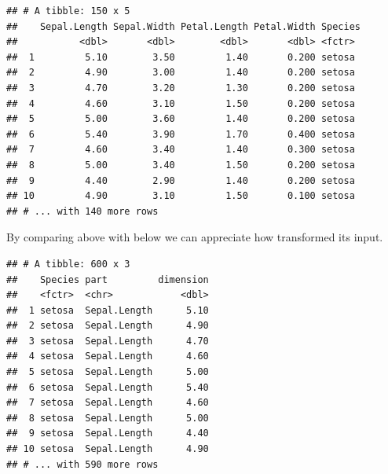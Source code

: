 \documentclass[krantz2,ChapterTOCs]{krantz}\usepackage{knitr}
\begin{document}
\begin{knitrout}\footnotesize
{}\color{fgcolor}\begin{kframe}
\begin{alltt}
 \hlkwb{<-} 
\end{alltt}
\begin{verbatim}
## # A tibble: 150 x 5
##    Sepal.Length Sepal.Width Petal.Length Petal.Width Species
##           <dbl>       <dbl>        <dbl>       <dbl> <fctr> 
##  1         5.10        3.50         1.40       0.200 setosa 
##  2         4.90        3.00         1.40       0.200 setosa 
##  3         4.70        3.20         1.30       0.200 setosa 
##  4         4.60        3.10         1.50       0.200 setosa 
##  5         5.00        3.60         1.40       0.200 setosa 
##  6         5.40        3.90         1.70       0.400 setosa 
##  7         4.60        3.40         1.40       0.300 setosa 
##  8         5.00        3.40         1.50       0.200 setosa 
##  9         4.40        2.90         1.40       0.200 setosa 
## 10         4.90        3.10         1.50       0.100 setosa 
## # ... with 140 more rows
\end{verbatim}
\end{kframe}
\end{knitrout}

By comparing  above with  below we can appreciate how  transformed its input.

\begin{knitrout}\footnotesize
{}\color{fgcolor}\begin{kframe}
\begin{alltt}
 \hlkwb{<-}      \hlopt{-}
\end{alltt}
\begin{verbatim}
## # A tibble: 600 x 3
##    Species part         dimension
##    <fctr>  <chr>            <dbl>
##  1 setosa  Sepal.Length      5.10
##  2 setosa  Sepal.Length      4.90
##  3 setosa  Sepal.Length      4.70
##  4 setosa  Sepal.Length      4.60
##  5 setosa  Sepal.Length      5.00
##  6 setosa  Sepal.Length      5.40
##  7 setosa  Sepal.Length      4.60
##  8 setosa  Sepal.Length      5.00
##  9 setosa  Sepal.Length      4.40
## 10 setosa  Sepal.Length      4.90
## # ... with 590 more rows
\end{verbatim}
\end{kframe}
\end{knitrout}
\end{document}
